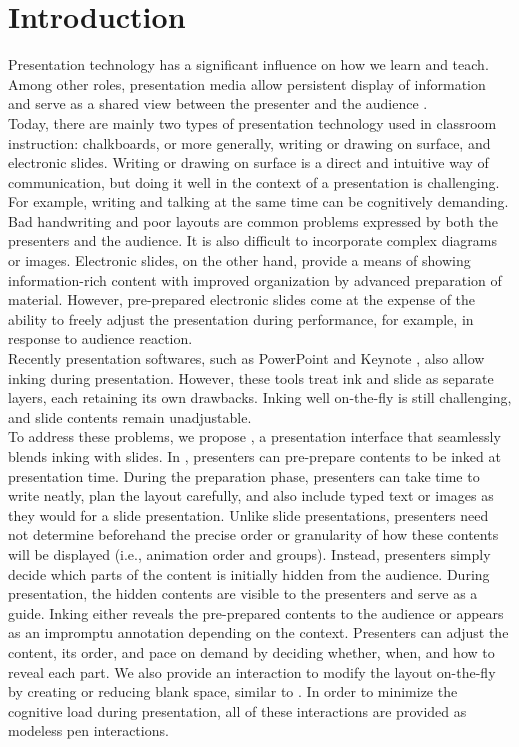 \section{Introduction}

Presentation technology has a significant influence on how we learn and teach. Among other roles, presentation media allow persistent display of information and serve as a shared view between the presenter and the audience \cite{anderson2004beyond}. \\

Today, there are mainly two types of presentation technology used in classroom instruction: chalkboards, or more generally, writing or drawing on surface, and electronic slides. Writing or drawing on surface is a direct and intuitive way of communication, but doing it well in the context of a presentation is challenging. For example, writing and talking at the same time can be cognitively demanding. Bad handwriting and poor layouts are common problems expressed by both the presenters and the audience. It is also difficult to incorporate complex diagrams or images. Electronic slides, on the other hand, provide a means of showing information-rich content with improved organization by advanced preparation of material. However, pre-prepared electronic slides come at the expense of the ability to freely adjust the presentation during performance, for example, in response to audience reaction. \\

Recently presentation softwares, such as PowerPoint \cite{powerpoint2017} and Keynote \cite{keynote2017}, also allow inking during presentation. However, these tools treat ink and slide as separate layers, each retaining its own drawbacks. Inking well on-the-fly is still challenging, and slide contents remain unadjustable. \\

To address these problems, we propose \interface{}, a presentation interface that seamlessly blends inking with slides. In \interface, presenters can pre-prepare contents to be inked at presentation time. During the preparation phase, presenters can take time to write neatly, plan the layout carefully, and also include typed text or images as they would for a slide presentation. Unlike slide presentations, presenters need not determine beforehand the precise order or granularity of how these contents will be displayed (i.e., animation order and groups). Instead, presenters simply decide which parts of the content is initially hidden from the audience. During presentation, the hidden contents are visible to the presenters and serve as a guide. Inking either reveals the pre-prepared contents to the audience or appears as an impromptu annotation depending on the context. Presenters can adjust the content, its order, and pace on demand by deciding whether, when, and how to reveal each part. We also provide an interaction to modify the layout on-the-fly by creating or reducing blank space, similar to \cite{yoon2013texttearing}. In order to minimize the cognitive load during presentation, all of these interactions are provided as modeless pen interactions. \\


